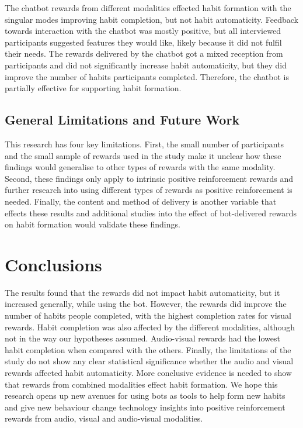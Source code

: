 \documentclass{scaffold/sigchi}
\begin{document}
The chatbot rewards from different modalities effected habit formation with the singular modes improving habit completion, but not habit automaticity. Feedback towards interaction with the chatbot was mostly positive, but all interviewed participants suggested features they would like, likely because it did not fulfil their needs. The rewards delivered by the chatbot got a mixed reception from participants and did not significantly increase habit automaticity, but they did improve the number of habits participants completed. Therefore, the chatbot is partially effective for supporting habit formation.


\subsection{General Limitations and Future Work}
This research has four key limitations. First, the small number of participants and the small sample of rewards used in the study make it unclear how these findings would generalise to other types of rewards with the same modality. Second, these findings only apply to intrinsic positive reinforcement rewards and further research into using different types of rewards as positive reinforcement is needed.  Finally, the content and method of delivery is another variable that effects these results and additional studies into the effect of bot-delivered rewards on habit formation would validate these findings. 

\section{Conclusions}
The results found that the rewards did not impact habit automaticity, but it increased generally, while using the bot. However, the rewards did improve the number of habits people completed, with the highest completion rates for visual rewards. Habit completion was also affected by the different modalities, although not in the way our hypotheses assumed. Audio-visual rewards had the lowest habit completion when compared with the others. Finally, the limitations of the study do not show any clear statistical significance whether the audio and visual rewards affected habit automaticity. More conclusive evidence is needed to show that rewards from combined modalities effect habit formation. We hope this research opens up new avenues for using bots as tools to help form new habits and give new behaviour change technology insights into positive reinforcement rewards from audio, visual and audio-visual modalities.
\end{document}
